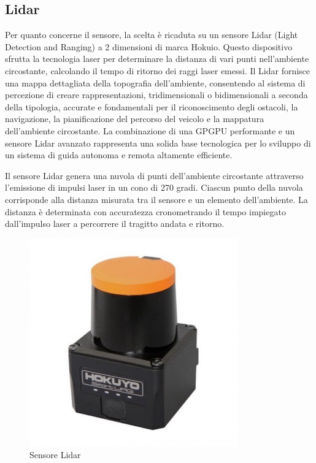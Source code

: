 \subsection{Lidar}
Per quanto concerne il sensore, la scelta è ricaduta su un sensore Lidar (Light Detection and Ranging) a 2 dimensioni di marca Hokuio. Questo dispositivo sfrutta la tecnologia laser per determinare la distanza di vari punti nell'ambiente circostante, calcolando il tempo di ritorno dei raggi laser emessi. Il Lidar fornisce una mappa dettagliata della topografia dell'ambiente, consentendo al sistema di percezione di creare rappresentazioni, tridimensionali o bidimensionali a seconda della tipologia, accurate e fondamentali per il riconoscimento degli ostacoli, la navigazione, la pianificazione del percorso del veicolo e la mappatura dell'ambiente circostante. La combinazione di una GPGPU performante e un sensore Lidar avanzato rappresenta una solida base tecnologica per lo sviluppo di un sistema di guida autonoma e remota altamente efficiente.

\noindent Il sensore Lidar genera una nuvola di punti dell'ambiente circostante attraverso l'emissione di impulsi laser in un cono di 270 gradi. Ciascun punto della nuvola corrisponde alla distanza misurata tra il sensore e un elemento dell'ambiente. La distanza è determinata con accuratezza cronometrando il tempo impiegato dall'impulso laser a percorrere il tragitto andata e ritorno.

\begin{figure}[h!]
  \centering
  \includegraphics[width=0.8\textwidth]{figures/sensore_hokuio.jpg}
  \caption{Sensore Lidar}
  \label{Sensore Lidar}
\end{figure}


